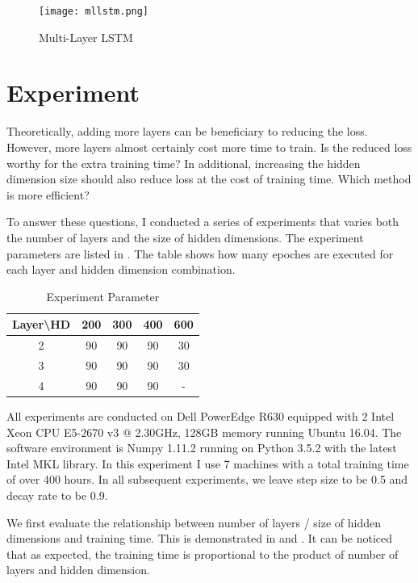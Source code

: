 \documentclass{article}
\begin{document}
\begin{figure}
\centering
\texttt{[image: mllstm.png]} 
\caption{Multi-Layer LSTM}
\label{fig:mllstm}
\end{figure} 

\section{Experiment}

Theoretically, adding more layers can be beneficiary to reducing the loss. However,
more layers almost certainly cost more time to train. Is the reduced loss worthy
for the extra training time? In additional, increasing the hidden dimension size
should also reduce loss at the cost of training time. Which method is more efficient?

To answer these questions, I conducted a series of experiments that varies both
the number of layers and the size of hidden dimensions. The experiment
parameters are listed in . The table shows how many epoches are 
executed for each layer and hidden dimension combination.

\renewcommand{\arraystretch}{1.2}
\begin{table}
\centering
\begin{tabular}{c|c|c|c|c}
\textbf{Layer\textbackslash HD} & 200 & 300 & 400 & 600\\
\hline
2 & 90& 90& 90& 30 \\
\hline
3 & 90& 90& 90& 30 \\
\hline
4 & 90& 90& 90& - \\
\end{tabular}
\caption{Experiment Parameter}
\label{tab:param}
\end{table}

All experiments are conducted on Dell PowerEdge R630 equipped with 2 Intel Xeon
CPU E5-2670 v3 @ 2.30GHz, 128GB memory running Ubuntu 16.04. The software 
environment is Numpy 1.11.2 running on Python 3.5.2 with the latest Intel MKL
library. In this experiment I use 7 machines with a total training time of 
over 400 hours. In all subsequent experiments, we leave step size to be 0.5 and
decay rate to be 0.9.

We first evaluate the relationship between number of layers / size of hidden
dimensions and training time. This is demonstrated in  and
. It can be noticed that as expected, the training time is
proportional to the product of number of layers and hidden dimension.
\end{document}

